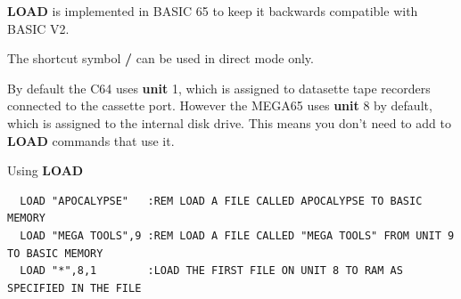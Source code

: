 \begin{description}[leftmargin=2cm,style=nextline]
   {\bf LOAD} is implemented in BASIC 65 to keep it backwards
   compatible with BASIC V2.

   The shortcut symbol {\bf /} can be used in direct mode only.

   By default the C64 uses {\bf unit} 1, which is assigned to datasette
   tape recorders connected to the cassette port. However the MEGA65
   uses {\bf unit} 8 by default, which is assigned to the internal
   disk drive. This means you don't need to add  to
   {\bf LOAD} commands that use it.

\item [Examples:] Using {\bf LOAD}
\begin{tcolorbox}[colback=black,coltext=white]
\verbatimfont{\codefont}
\begin{verbatim}
  LOAD "APOCALYPSE"   :REM LOAD A FILE CALLED APOCALYPSE TO BASIC MEMORY
  LOAD "MEGA TOOLS",9 :REM LOAD A FILE CALLED "MEGA TOOLS" FROM UNIT 9 TO BASIC MEMORY
  LOAD "*",8,1        :LOAD THE FIRST FILE ON UNIT 8 TO RAM AS SPECIFIED IN THE FILE
\end{verbatim}
\end{tcolorbox}
\end{description}


\newpage
